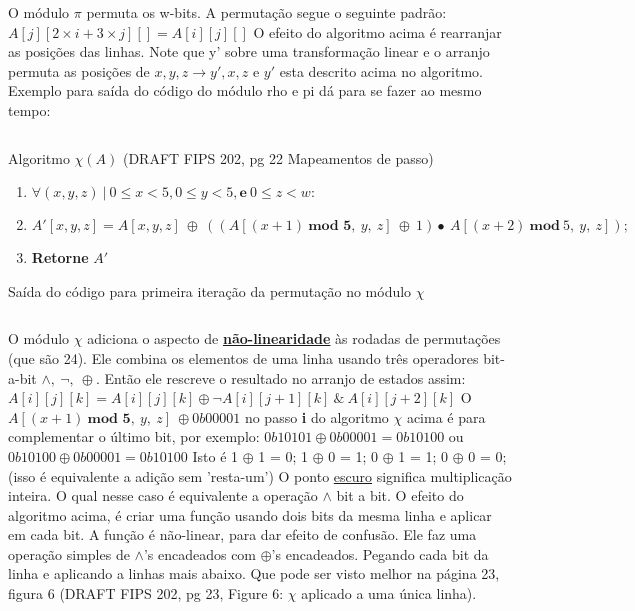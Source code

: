 \documentclass[12pt, a4paper]{article}
\begin{document}
\begin{enumerate}
\begin{enumerate}
O módulo $\pi$ permuta os w-bits. A permutação segue o seguinte padrão:
$A[j][2\times i+3\times j][]=A[i][j][]$ O efeito do algoritmo acima é rearranjar
as posições das linhas. Note que y' sobre uma transformação linear e o arranjo
permuta as posições de $x,y,z \rightarrow y',x,z$ e $y'$ esta descrito acima no
algoritmo.\\

Exemplo para saída do código do módulo rho e pi dá para se fazer ao mesmo tempo:
\begin{verbatim}

\end{verbatim}

Algoritmo $\chi(A)$ (DRAFT FIPS 202, pg 22 Mapeamentos de passo)
  \begin{enumerate}
    \item $\forall (x,y,z)\ |\ 0 \le x < 5, 0 \le y < 5, \textbf{e}\ 0 \le z
    < w:$

    \item[] \quad $A'[x,y,z] = A[x,y,z]\ \oplus\ ((A[(x+1)\ \textbf{mod 5},\
    y,\ z]\ \oplus\ 1) \bullet\ A[(x+2)\ \textbf{mod}\ 5,\ y,\ z]);$

    \item \textbf{Retorne} $A'$\\
  \end{enumerate}

Saída do código para primeira iteração da permutação no módulo $\chi$
\begin{verbatim}

\end{verbatim}

O módulo $\chi$ adiciona o aspecto de \underline{\textbf{não-linearidade}} às
rodadas de permutações (que são 24). Ele combina os elementos de uma linha
usando três operadores bit-a-bit $\land,\ \lnot,\ \oplus$. Então ele rescreve o
resultado no arranjo de estados assim: $A[i][j][k] = A[i][j][k] \oplus \lnot
A[i][j+1][k]\ \&\ A[i][j+2][k]$ O $A[(x+1)\ \textbf{mod 5},\ y,\ z]\ \oplus
0b00001$ no passo \textbf{i} do algoritmo $\chi$ acima é para complementar o
último bit, por exemplo: $0b10101 \oplus 0b00001 = 0b10100$ ou $0b10100 \oplus
0b00001 = 0b10100$ Isto é 1 $\oplus$ 1 = 0; 1 $\oplus$ 0 = 1; 0 $\oplus$ 1 = 1;
0 $\oplus$ 0 = 0; (isso é equivalente a adição sem 'resta-um') O ponto
\underline{escuro} significa multiplicação inteira. O qual nesse caso é
equivalente a operação $\land$ bit a bit. O efeito do algoritmo acima, é criar
uma função usando dois bits da mesma linha e aplicar em cada bit. A função é
não-linear, para dar efeito de confusão. Ele faz uma operação simples de
$\land$'s encadeados com $\oplus$'s encadeados. Pegando cada bit da linha e
aplicando a linhas mais abaixo. Que pode ser visto melhor na página 23, figura 6
(DRAFT FIPS 202, pg 23, Figure 6: $\chi$ aplicado a uma única linha).\\


\end{enumerate}
\end{enumerate}
\end{document}
